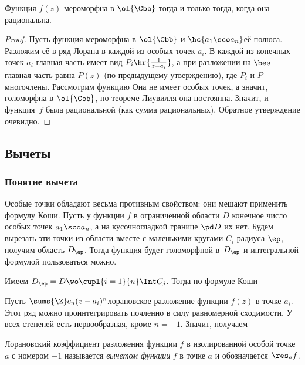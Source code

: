 \documentclass[a4paper]{article}
\begin{document}
\begin{stm}
Функция $f(z)$ мероморфна в $\ol{\Cbb}$ тогда и только тогда, когда она рациональна.
\end{stm}
\begin{proof}
Пусть функция мероморфна в $\ol{\Cbb}$ и $\hc{a_1 \sco a_n}$\т её полюса.
Разложим её в ряд Лорана в каждой из особых точек $a_i$. В каждой из конечных точек $a_i$ главная часть имеет
вид $P_i\hr{\frac{1}{z-a_i}}$, а при разложении на $\bes$ главная часть равна $P(z)$ (по предыдущему утверждению),
где $P_i$ и $P$\т многочлены. Рассмотрим функцию
Она не имеет особых точек, а значит, голоморфна в $\ol{\Cbb}$, по теореме Лиувилля она постоянна. Значит, и функция~$f$
была рациональной (как сумма рациональных). Обратное утверждение очевидно.
\end{proof}

\subsection{Вычеты}

\subsubsection{Понятие вычета}

Особые точки обладают весьма противным
свойством: они мешают применить формулу Коши. Пусть
у функции $f$ в ограниченной области $D$ конечное число особых точек $a_1 \sco a_n$, а
на кусочно\д гладкой границе $\pd D$ их нет. Будем вырезать эти точки из области вместе
с маленькими кругами $C_i$ радиуса $\ep$, получим область $D_\ep$. Тогда функция будет голоморфной
в~$D_\ep$ и интегральной формулой пользоваться можно.

Имеем $D_\ep= D \wo \cupl{i=1}{n}\Int C_j$. Тогда по формуле Коши

Пусть $\sums{\Z}c_n(z-a_i)^n$\т лорановское разложение функции $f(z)$ в точке $a_i$.
Этот ряд можно проинтегрировать почленно в силу равномерной сходимости. У всех степеней есть первообразная, кроме
$n=-1$. Значит, получаем

\begin{df}
Лорановский коэффициент разложения функции $f$ в изолированной особой точке $a$ с номером $-1$
называется \emph{вычетом функции} $f$ в точке $a$ и обозначается $\res_a f$.
\end{df}
\end{document}
